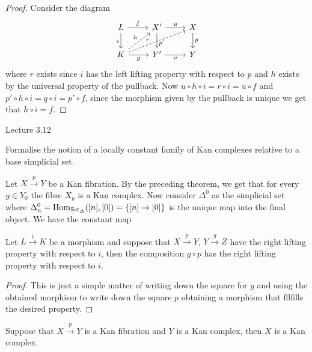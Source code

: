 \begin{proof}
    Consider the diagram
    \[
    \begin{tikzcd}
        L
        \ar[r,"f"]
        \ar[d,"i"']
        &
        X'
        \arrow[d,"p'" pos=0.65]
        \ar[r, "u"]
        &
        X
        \ar[d,"p"]
        \\
        K
        \arrow[r,"g"']
        \ar[rru, dashed, "r" pos= 0.4]
        \ar[ru, dashed, "h"]
        &
        Y'
        \ar[r,"v"']
        &
        Y    
    \end{tikzcd}
    \]
    where $r$ exists since $i$ has the left lifting property with respect to $p$ and $h$ exists by the universal property of the pullback.
    Now $u \circ h \circ i = r \circ i = u \circ f$ and $p' \circ h \circ i = q \circ i = p' \circ f$, since the  morphism given by the pullback is unique we get that $h \circ i = f$.
\end{proof}

Lecture 3.12 

Formalise the notion of a locally constant family of Kan complexes relative to a base simplicial set.

\begin{defi}
    Let $X \xrightarrow{p} Y$ be a Kan fibration. 
    By the preceding theorem, we get that for every $y\in Y_0$ the fibre $X_y$ is a Kan complex. 
    Now consider $\Delta^0$ as the simplicial set where $\Delta^0_n=\operatorname{Hom}_{\operatorname{Set}_{\Delta}}([n],[0])=\{[n] \to [0]\}$ is the unique map into the final object.
    We have the constant map 
\end{defi}

\begin{prop}
\label{comp_Kan_fib}
    Let $L \xrightarrow{i} K$ be a morphism and suppose that $X \xrightarrow{p} Y$, $Y \xrightarrow{g} Z$ have the right lifting property with respect to $i$, then the composition $g \circ p$ has the right lifting property with respect to $i$.
\end{prop}

\begin{proof}
    This is just a simple matter of writing down the square for $g$ and using the obtained morphism to write down the square $p$ obtaining a morphism that fllfills the desired property.
\end{proof}

\begin{cor}
    Suppose that $X \xrightarrow{p} Y$ is a Kan fibration and $Y$ is a Kan complex, then $X$ is a Kan complex.
\end{cor}

